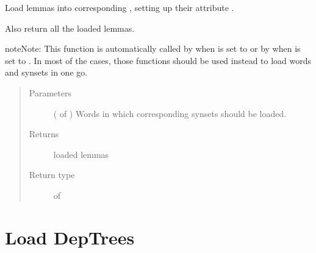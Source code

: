 \documentclass[letterpaper,10pt,english]{sphinxmanual}
\begin{document}
\begin{fulllineitems}
\label{\detokenize{load:loacore.load.lemma_load.load_lemmas_in_words}}
Load lemmas into corresponding , setting up their attribute .

Also return all the loaded lemmas.

\begin{sphinxadmonition}{note}{Note:}
This function is automatically called by  when  is set to
 or by  when  is set to .
In most of the cases, those functions should be used instead to load words and synsets in one go.
\end{sphinxadmonition}
\begin{quote}\begin{description}
\item[{Parameters}] \leavevmode
{} ( of ) \textendash{} Words in which corresponding synsets should be loaded.

\item[{Returns}] \leavevmode
loaded lemmas

\item[{Return type}] \leavevmode
{} of 

\end{description}\end{quote}

\end{fulllineitems}



\section{Load DepTrees}
\label{\detokenize{load:module-loacore.load.deptree_load}}\label{\detokenize{load:load-deptrees}}
\end{document}
